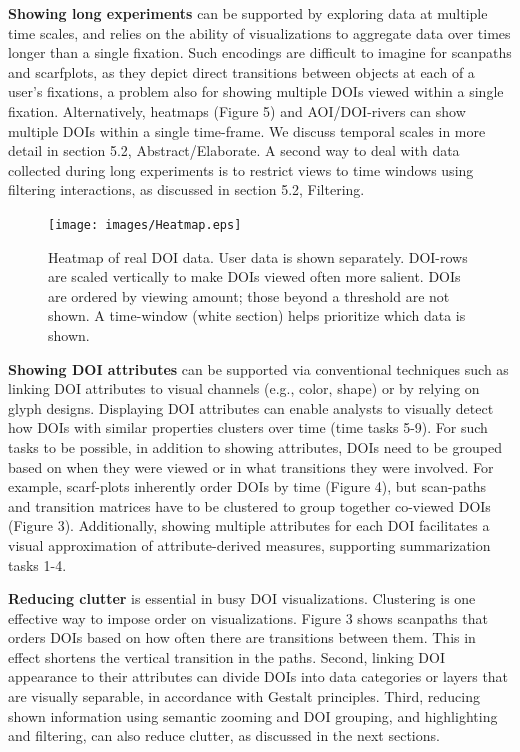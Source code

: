 \noindent \textbf{Showing long experiments} can be supported by exploring data at multiple time scales, and relies on the ability of visualizations to aggregate data over times longer than a single fixation. Such encodings are difficult to imagine for scanpaths and scarfplots, as they depict direct transitions between objects at each of a user's fixations, a problem also for showing multiple DOIs viewed within a single fixation. Alternatively, heatmaps (Figure 5) and AOI/DOI-rivers can show multiple DOIs within a single time-frame. We discuss temporal scales in more detail in section 5.2, Abstract/Elaborate. A second way to deal with data collected during long experiments is to restrict views to time windows using filtering interactions, as discussed in section 5.2, Filtering.

\begin{figure}[htb]
  \centering
	\texttt{[image: images/Heatmap.eps]}
  \caption{Heatmap of real DOI data. User data is shown separately. DOI-rows are scaled vertically to make DOIs viewed often more salient. DOIs are ordered by viewing amount; those beyond a threshold are not shown.
  A time-window (white section) helps prioritize which data is shown.}
	\label{fig:heatmap}
\end{figure}


\noindent \textbf{Showing DOI attributes} can be supported via conventional techniques such as linking DOI attributes to visual channels (e.g., color, shape) or by relying on glyph designs. Displaying DOI attributes can enable analysts to visually detect how DOIs with similar properties clusters over time (time tasks 5-9). For such tasks to be possible, in addition to showing attributes, DOIs need to be grouped based on when they were viewed or in what transitions they were involved. For example, scarf-plots inherently order DOIs by time (Figure 4), but scan-paths and transition matrices have to be clustered to group together co-viewed DOIs (Figure 3). Additionally, showing multiple attributes for each DOI facilitates a visual approximation of attribute-derived measures, supporting summarization tasks 1-4. 

\noindent \textbf{Reducing clutter} is essential in busy DOI visualizations. Clustering is one effective way to impose order on visualizations. Figure 3 shows scanpaths that orders DOIs based on how often there are transitions between them. This in effect shortens the vertical transition in the paths. Second, linking DOI appearance to their attributes can divide DOIs into data categories or layers that are visually separable, in accordance with Gestalt principles. Third, reducing shown information using semantic zooming and DOI grouping, and highlighting and filtering, can also reduce clutter, as discussed in the next sections. 

